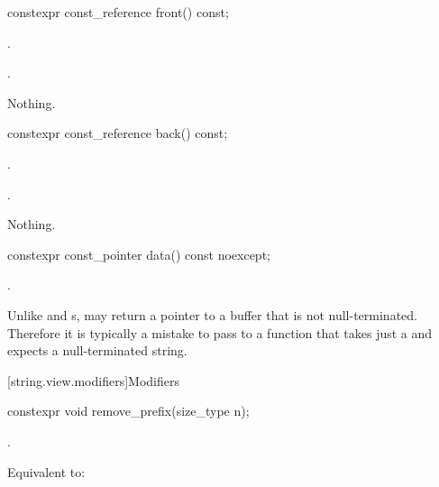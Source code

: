 %
\begin{itemdecl}
constexpr const_reference front() const;
\end{itemdecl}

\begin{itemdescr}
\pnum
\expects
{}.

\pnum
\returns
{}.

\pnum
\throws
Nothing.
\end{itemdescr}

%
\begin{itemdecl}
constexpr const_reference back() const;
\end{itemdecl}

\begin{itemdescr}
\pnum
\expects
{}.

\pnum
\returns
{}.

\pnum
\throws
Nothing.
\end{itemdescr}

%
\begin{itemdecl}
constexpr const_pointer data() const noexcept;
\end{itemdecl}

\begin{itemdescr}
\pnum
\returns
{}.

\pnum
\begin{note}
Unlike  and s,
 may return a pointer to a buffer that is not null-terminated.
Therefore it is typically a mistake to pass  to a function that takes just a  and expects a null-terminated string.
\end{note}
\end{itemdescr}

[string.view.modifiers]{Modifiers}

%
\begin{itemdecl}
constexpr void remove_prefix(size_type n);
\end{itemdecl}

\begin{itemdescr}
\pnum
\expects
{}.

\pnum
\effects
Equivalent to: 
\end{itemdescr}

